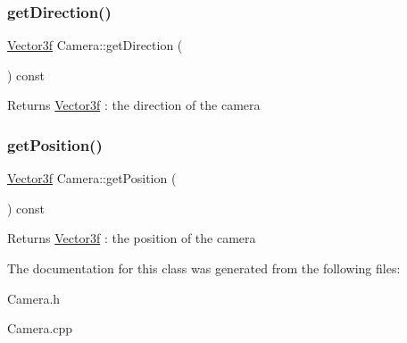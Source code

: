 \subsubsection{\texorpdfstring{get\+Direction()}{getDirection()}}
{\footnotesize\ttfamily \mbox{\hyperlink{class_vector3f}{Vector3f}} Camera\+::get\+Direction (\begin{DoxyParamCaption}{ }\end{DoxyParamCaption}) const\hspace{0.3cm}{\ttfamily [inline]}}

\begin{DoxyReturn}{Returns}
\mbox{\hyperlink{class_vector3f}{Vector3f}} \+: the direction of the camera 
\end{DoxyReturn}
\mbox{\label{class_camera_a4e257bcf641d333ce77bac775792a9c3}} 
\subsubsection{\texorpdfstring{get\+Position()}{getPosition()}}
{\footnotesize\ttfamily \mbox{\hyperlink{class_vector3f}{Vector3f}} Camera\+::get\+Position (\begin{DoxyParamCaption}{ }\end{DoxyParamCaption}) const\hspace{0.3cm}{\ttfamily [inline]}}

\begin{DoxyReturn}{Returns}
\mbox{\hyperlink{class_vector3f}{Vector3f}} \+: the position of the camera 
\end{DoxyReturn}


The documentation for this class was generated from the following files\+:\begin{DoxyCompactItemize}
\item 
Camera.\+h\item 
Camera.\+cpp\end{DoxyCompactItemize}
